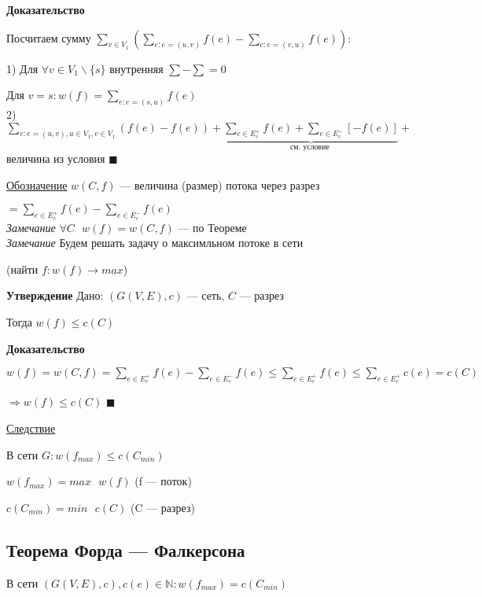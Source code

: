 \documentclass[a4paper, 12pt] {article}
\begin{document}
\textbf{Доказательство}

Посчитаем сумму $ \sum\limits_{v \in V_{1}} (\sum\limits_{e: e = (u, v)} f(e)- \sum\limits_{e: e = (v, u)} f(e)): $

1) Для $ \forall v \in V_{1} \backslash \{s\} $ внутренняя $ \sum - \sum =0 $

Для $ v = s: w(f) = \sum\limits_{e: e = (s, u)} f(e) $\\

2) $ \sum\limits_{e: e = (u, v), u \in V_{1}, v \in V_{1}} (f(e)-f(e)) + \underbrace{\sum\limits_{e \in E_{c}^{+}} f(e) + \sum\limits_{e \in E_{c}^{-}} [-f(e)]}_{\text{см. условие }} +$ величина из условия $ \blacksquare $

\underline{Обозначение} $ w(C, f) $ --- величина (размер) потока через разрез 

$ = \sum\limits_{e \in E_{c}^{+}} f(e) - \sum\limits_{e \in E_{c}^{-}} f(e) $\\

\textit{Замечание } $ \forall C \text{	} w(f) = w(C, f) $ --- по Теореме\\

\textit{Замечание } Будем решать задачу о максимльном потоке в сети 

(найти $ f: w(f) \rightarrow max$)\\

\newpage

\textbf{Утверждение} Дано: $ (G(V, E), c) $ --- сеть, $ C $ --- разрез

Тогда $ w(f) \le c(C) $

\textbf{Доказательство}

$ w(f) = w(C, f) = \sum\limits_{e \in E_{c}^{+}} f(e) - \sum\limits_{e \in E_{c}^{-}} f(e) \le \sum\limits_{e \in E_{c}^{+}} f(e) \le \sum\limits_{e \in E_{c}^{+}} c(e) = c(C)$

$ \Rightarrow w(f) \le c(C) $ $ \blacksquare $

\underline{Следствие}

\hypertarget{link2}{В сети $ G: w(f_{max}) \le c(C_{min}) $}

$ w(f_{max}) = max \text{ } w(f) $ (f --- поток)

$ c(C_{min}) = min \text{ } c(C) $ (C --- разрез)\\

\subsection{Теорема Форда — Фалкерсона}
В сети $ (G(V, E), c), c(e) \in 
\mathbb N: w(f_{max}) = c(C_{min})$ 
\end{document}
